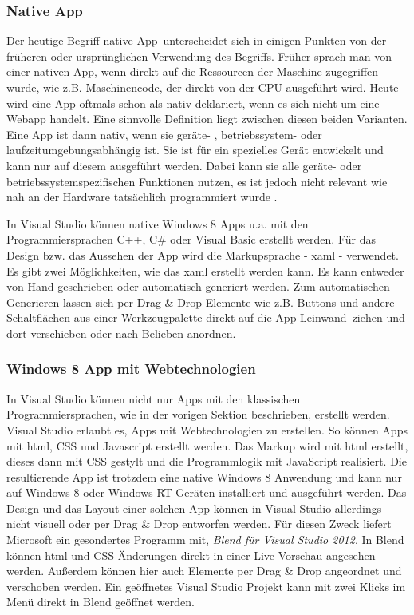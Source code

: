 \documentclass[12pt,a4paper,bibtotoc,abstracton]{scrartcl}
\begin{document}
\subsubsection{Native App}
\label{subsubsec:nativ}
Der heutige Begriff \glqq native App\grqq\ unterscheidet sich in einigen Punkten von der früheren oder ursprünglichen Verwendung des Begriffs. Früher sprach man von einer nativen App, wenn direkt auf die Ressourcen der  Maschine zugegriffen wurde, wie z.B. Maschinencode, der direkt von der CPU ausgeführt wird. Heute wird eine App oftmals schon als nativ deklariert, wenn es sich nicht um eine Webapp handelt. Eine sinnvolle Definition liegt zwischen diesen beiden Varianten. Eine App ist dann nativ, wenn sie geräte- , betriebssystem- oder laufzeitumgebungsabhängig ist. Sie ist für ein spezielles Gerät entwickelt und kann nur auf diesem ausgeführt werden. Dabei kann sie alle geräte- oder betriebssystemspezifischen Funktionen nutzen, es ist jedoch nicht relevant wie nah an der Hardware tatsächlich programmiert wurde \citep{OBrian2013}.

In Visual Studio können native Windows 8  Apps u.a. mit den Programmiersprachen C++, C\# oder Visual Basic erstellt werden. Für das Design bzw. das Aussehen der App wird die Markupsprache - \ac{xaml} - verwendet. Es gibt zwei Möglichkeiten, wie das \ac{xaml} erstellt werden kann. Es kann entweder von Hand geschrieben oder automatisch generiert werden. Zum automatischen Generieren lassen sich per Drag \& Drop Elemente wie z.B. Buttons und andere Schaltflächen aus einer Werkzeugpalette direkt auf die \glqq App-Leinwand\grqq\ ziehen und dort verschieben oder nach Belieben anordnen.

\subsubsection{Windows 8 App mit Webtechnologien}
\label{subsubsec:webwin8}
In Visual Studio können nicht nur Apps mit den klassischen Programmiersprachen, wie in der vorigen Sektion beschrieben, erstellt werden. Visual Studio erlaubt es, Apps mit Webtechnologien zu erstellen. So können Apps mit \ac{html}, CSS und Javascript erstellt werden. Das Markup wird mit \ac{html} erstellt, dieses dann mit CSS gestylt und die Programmlogik mit JavaScript realisiert. Die resultierende App ist trotzdem eine native Windows 8 Anwendung und kann nur auf Windows 8 oder Windows RT Geräten installiert und ausgeführt werden. Das Design und das Layout einer solchen App können in Visual Studio allerdings nicht visuell oder per Drag \& Drop entworfen werden. Für diesen Zweck liefert Microsoft ein gesondertes Programm mit, \textit{Blend für Visual Studio 2012}. In Blend können \ac{html} und CSS Änderungen direkt in einer Live-Vorschau angesehen werden. Außerdem können hier auch Elemente per Drag \& Drop angeordnet und verschoben werden. Ein geöffnetes Visual Studio Projekt kann mit zwei Klicks im Menü direkt in Blend geöffnet werden. 
\end{document}
